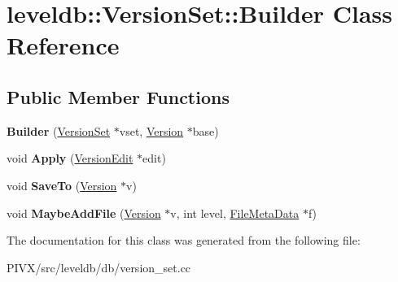\hypertarget{classleveldb_1_1_version_set_1_1_builder}{}\section{leveldb\+:\+:Version\+Set\+:\+:Builder Class Reference}
\label{classleveldb_1_1_version_set_1_1_builder}
\subsection*{Public Member Functions}
\begin{DoxyCompactItemize}
\item 
\mbox{\label{classleveldb_1_1_version_set_1_1_builder_a19d0dd9aec1b825e7d938e9ac24dc4f7}} 
{\bfseries Builder} (\mbox{\hyperlink{classleveldb_1_1_version_set}{Version\+Set}} $\ast$vset, \mbox{\hyperlink{classleveldb_1_1_version}{Version}} $\ast$base)
\item 
\mbox{\label{classleveldb_1_1_version_set_1_1_builder_aef505b4363ebc56b8fa5deb55087993f}} 
void {\bfseries Apply} (\mbox{\hyperlink{classleveldb_1_1_version_edit}{Version\+Edit}} $\ast$edit)
\item 
\mbox{\label{classleveldb_1_1_version_set_1_1_builder_a429b23cc022cac08ab2ba880ac5803d1}} 
void {\bfseries Save\+To} (\mbox{\hyperlink{classleveldb_1_1_version}{Version}} $\ast$v)
\item 
\mbox{\label{classleveldb_1_1_version_set_1_1_builder_aa90e0d9d0f8e05b8bcfa879d4f4a88c6}} 
void {\bfseries Maybe\+Add\+File} (\mbox{\hyperlink{classleveldb_1_1_version}{Version}} $\ast$v, int level, \mbox{\hyperlink{structleveldb_1_1_file_meta_data}{File\+Meta\+Data}} $\ast$f)
\end{DoxyCompactItemize}


The documentation for this class was generated from the following file\+:\begin{DoxyCompactItemize}
\item 
P\+I\+V\+X/src/leveldb/db/version\+\_\+set.\+cc\end{DoxyCompactItemize}
